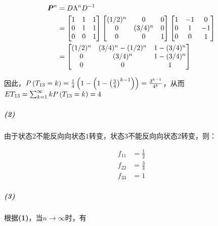 \documentclass{article}
\begin{document}
    \begin{equation}
        \begin{aligned}
            \boldsymbol P^n &= D\Lambda^n D^{-1} \\
            &= \begin{bmatrix}
                1 & 1 & 1 \\
                0 & 1 & 1 \\
                0 & 0 & 1 \\
            \end{bmatrix}\begin{bmatrix}
                (1/2)^n & 0 & 0 \\
                0 & (3/4)^n & 0 \\
                0 & 0 & 1 \\
            \end{bmatrix}\begin{bmatrix}
                1 & -1 & 0 \\
                0 & 1 & -1 \\
                0 & 0 & 1 \\
            \end{bmatrix} \\
            &= \begin{bmatrix}
                (1/2)^n & (3/4)^n - (1/2)^n & 1 - (3/4)^n \\
                0 & (3/4)^n & 1 - (3/4)^n \\
                0 & 0 & 1
            \end{bmatrix}
        \end{aligned}
    \end{equation}

    因此，$P\left(T_{13} = k\right) = \frac 14 \left(1 - \left(1 - \left(\frac 34\right)^{k-1}\right)\right) = \frac{3^{k-1}}{4^k}$，从而$ET_{13} = \sum_{k=1}^\infty kP\left(T_{13} = k\right) = 4$

    \subparagraph*{(2)} 由于状态$2$不能反向向状态$1$转变，状态$3$不能反向向状态$2$转变，则：

    \begin{equation}
        \begin{aligned}
            f_{11} &= \frac 12 \\
            f_{22} &= \frac 34 \\
            f_{33} &= 1
        \end{aligned}
    \end{equation}

    \subparagraph*{(3)} 根据\textbf{(1)}，当$n\rightarrow \infty$时，有
\end{document}
